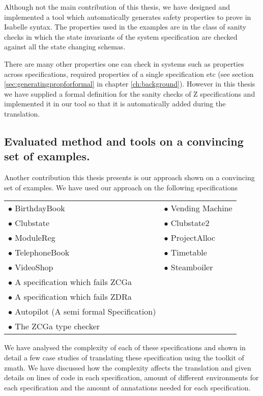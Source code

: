 Although not the main contribution of this thesis, we have designed and implemented a tool which automatically generates safety properties to prove in Isabelle syntax. The properties used in the examples are in the class of sanity checks in which the state invariants of the system specification are checked against all the state changing schemas.

There are many other properties one can check in systems such as properties across specifications, required properties of a single specification etc (see section \ref{sec:generatingpropforformal} in chapter \ref{ch:background}). However in this thesis we have supplied a formal definition for the sanity checks of Z specifications and implemented it in our tool so that it is automatically added during the translation.


\subsection{Evaluated method and tools on a convincing set of examples.}

Another contribution this thesis presents is our approach shown on a convincing set of examples. We have used our approach on the following specifications

\begin{tabular}{l l}
$\bullet$ BirthdayBook \cite{spiveyreferencemanual} & $\bullet$ Vending Machine \cite{pp} \\
$\bullet$ Clubstate \cite{essenceofz} & $\bullet$ Clubstate2 \cite{essenceofz} \\
$\bullet$ ModuleReg \cite{essenceofz} & $\bullet$ ProjectAlloc \cite{essenceofz} \\
$\bullet$ TelephoneBook & $\bullet$ Timetable \cite{essenceofz} \\
$\bullet$ VideoShop \cite{essenceofz} & $\bullet$ Steamboiler \\
$\bullet$ A specification which fails ZCGa & \\
$\bullet$ A specification which fails ZDRa & \\
$\bullet$ Autopilot (A semi formal Specification) \cite{Butler96} & \\
$\bullet$ The ZCGa type checker & \\
\end{tabular}

We have analysed the complexity of each of these specifications and shown in detail a few case studies of translating these specification using the toolkit of \gls{zmath}. We have discussed how the complexity affects the translation and given details on lines of code in each specification, amount of different environments for each specification and the amount of annatations needed for each specification.

